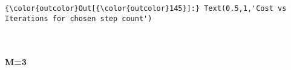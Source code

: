 \documentclass[11pt]{article}
\begin{document}
\begin{Verbatim}[commandchars=\\\{\}]
{\color{outcolor}Out[{\color{outcolor}145}]:} Text(0.5,1,'Cost vs Iterations for chosen step count')
\end{Verbatim}
            
    \begin{center}
    \end{center}
    { \hspace*{\fill} \\}
    
    \paragraph{M=3}\label{m3}
\end{document}
